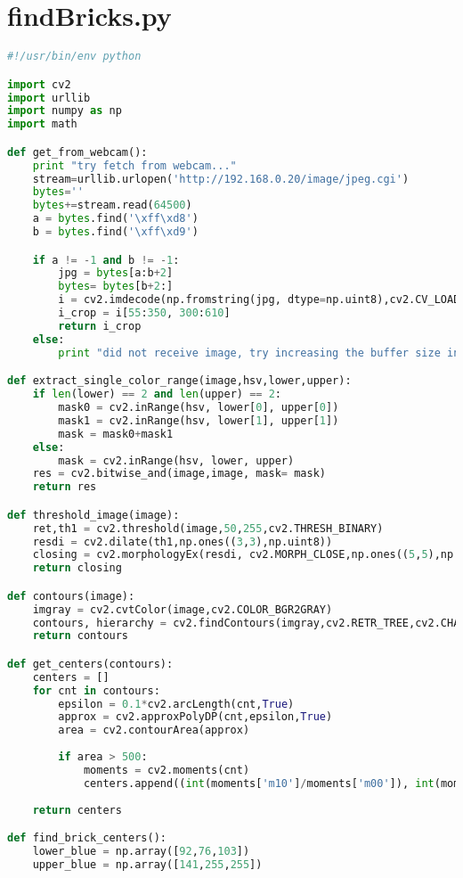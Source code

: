 \section{findBricks.py}\label{sec:VisionFuntioner}
\begin{lstlisting}[language=Python]
#!/usr/bin/env python

import cv2
import urllib
import numpy as np
import math

def get_from_webcam():
    print "try fetch from webcam..."
    stream=urllib.urlopen('http://192.168.0.20/image/jpeg.cgi')
    bytes=''
    bytes+=stream.read(64500)
    a = bytes.find('\xff\xd8')
    b = bytes.find('\xff\xd9')

    if a != -1 and b != -1:
        jpg = bytes[a:b+2]
        bytes= bytes[b+2:]
        i = cv2.imdecode(np.fromstring(jpg, dtype=np.uint8),cv2.CV_LOAD_IMAGE_COLOR)
        i_crop = i[55:350, 300:610]
        return i_crop
    else:
        print "did not receive image, try increasing the buffer size in line 13:"

def extract_single_color_range(image,hsv,lower,upper):
    if len(lower) == 2 and len(upper) == 2:
        mask0 = cv2.inRange(hsv, lower[0], upper[0])
        mask1 = cv2.inRange(hsv, lower[1], upper[1])
        mask = mask0+mask1
    else:
        mask = cv2.inRange(hsv, lower, upper)
    res = cv2.bitwise_and(image,image, mask= mask)
    return res

def threshold_image(image):
    ret,th1 = cv2.threshold(image,50,255,cv2.THRESH_BINARY)
    resdi = cv2.dilate(th1,np.ones((3,3),np.uint8))
    closing = cv2.morphologyEx(resdi, cv2.MORPH_CLOSE,np.ones((5,5),np.uint8))
    return closing

def contours(image):
    imgray = cv2.cvtColor(image,cv2.COLOR_BGR2GRAY)
    contours, hierarchy = cv2.findContours(imgray,cv2.RETR_TREE,cv2.CHAIN_APPROX_SIMPLE)
    return contours

def get_centers(contours):
    centers = []
    for cnt in contours:
        epsilon = 0.1*cv2.arcLength(cnt,True)
        approx = cv2.approxPolyDP(cnt,epsilon,True)
        area = cv2.contourArea(approx)
        
        if area > 500:
            moments = cv2.moments(cnt)
            centers.append((int(moments['m10']/moments['m00']), int(moments['m01']/moments['m00'])))
    
    return centers

def find_brick_centers():    
    lower_blue = np.array([92,76,103])
    upper_blue = np.array([141,255,255])
    

\end{lstlisting}
